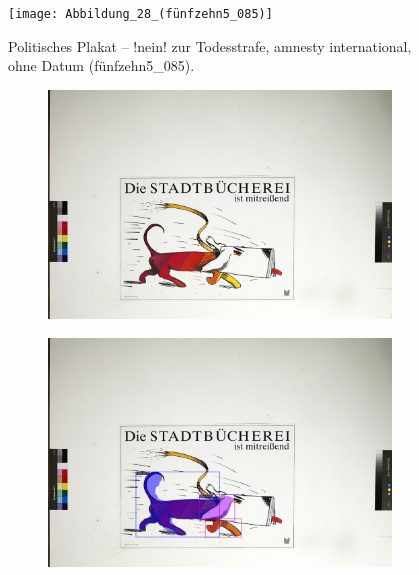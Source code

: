 \documentclass[a4paper,12pt,ngerman]{article}
\begin{document}
\newpage
\begin{figure}[ht]
\texttt{[image: Abbildung\_28\_(fünfzehn5\_085)]}
\centering
\caption{Politisches Plakat – !nein! zur Todesstrafe, amnesty international, ohne Datum (fünfzehn5\_085).}
\end{figure}

\newpage
\begin{figure}[ht]
	\begin{subfigure}[b]{\linewidth}
	\centering
	\includegraphics[height=\linewidth, angle=90]{Abbildung_29_(acht1_015)}
	\end{subfigure}
	\begin{subfigure}[b]{\linewidth}
	\centering
	\includegraphics[height=\linewidth, angle=90]{Abbildung_29_(acht1_015)_with_detections}

\end{subfigure}
\end{figure}
\end{document}
